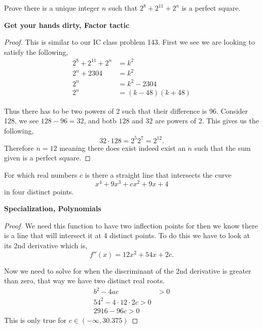 \documentclass[11pt]{article}
\newenvironment{problem}[2][Problem\!]{\begin{trivlist}
\item[\hskip \labelsep {\bfseries #1}\hskip \labelsep {\bfseries #2}]}{\end{trivlist}}
\begin{document}
\begin{tcolorbox}
    \begin{problem} {OC | 11/12 | 90.}
        Prove there is a unique integer $n$ such that $2^{8} + 2^{11} + 2^{n}$ is a perfect square.
    \end{problem}
    \textbf{Get your hands dirty, Factor tactic}
\end{tcolorbox}
\begin{proof}
    This is similar to our IC class problem 143. First we see we are looking to satisfy the following,
    \begin{align*}
        2^{8} + 2^{11} + 2^{n} &= k^{2} \\
        2^{n} + 2304 &= k^{2} \\
        2^{n} &= k^{2} - 2304 \\
        2^{n} &= (k - 48)(k+48)
    \end{align*}

    Thus there has to be two powers of 2 such that their difference is 96. Consider 128, we see $128-96 = 32$, and botb $128$ and $32$ are powers of 2. This gives us the following,
    \[32 \cdot 128 = 2^{5} 2^{7} = 2^{12}.\]
    Therefore $n =12$ meaning there does exist indeed exist an $n$ such that the sum given is a perfect square.
\end{proof}




\begin{tcolorbox}
    \begin{problem} {IC | 11-22 | PP14}
        For which real numbers $c$ is there a straight line that intersects the curve \[x^{4} + 9x^{3} + cx^{2} + 9x + 4\]
        in four distinct points. 
    \end{problem}
    \textbf{Specialization, Polynomials}
\end{tcolorbox}
\begin{proof}
    We need this function to have two inflection points for then we know there is a line that will intersect it at 4 distinct points. To do this we have to look at its 2nd derivative which is,
    \[f''(x) = 12x^{2} + 54x + 2c.\]

    Now we need to solve for when the discriminant of the 2nd derivative is greater than zero, that way we have two distinct real roots. 
    \begin{align*}
        b^{2} - 4ac &> 0 \\
        54^{2} - 4\cdot12 \cdot 2c  > 0 \\
        2916 - 96c > 0 
    \end{align*}
    This is only true for $c \in (-\infty,30.375)$

\end{proof}
\end{document}
